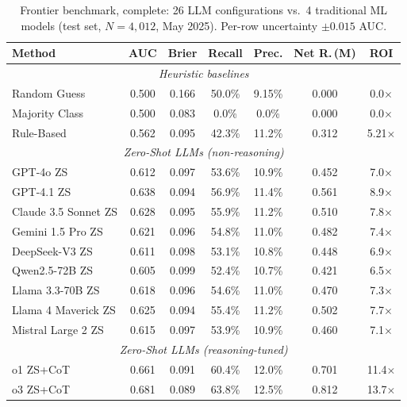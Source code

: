 \documentclass[11pt, a4paper]{article}
\begin{document}
\begin{table}[H]
\centering
\caption{Frontier benchmark, complete: 26 LLM configurations vs.\ 4 traditional ML models (test set, $N=4{,}012$, May 2025). Per-row uncertainty $\pm 0.015$ AUC.}\label{tab:llm_vs_ml_full}
\scriptsize
\renewcommand{\arraystretch}{1.05}
\setlength{\tabcolsep}{4pt}
\begin{tabular}{@{}lcccccc@{}}
\toprule
\textbf{Method} & \textbf{AUC} & \textbf{Brier} & \textbf{Recall} & \textbf{Prec.} & \textbf{Net R.\,(M)} & \textbf{ROI}\\
\midrule
\multicolumn{7}{c}{\textit{Heuristic baselines}}\\
Random Guess          & 0.500 & 0.166 & 50.0\% & 9.15\% & 0.000 & 0.0$\times$\\
Majority Class        & 0.500 & 0.083 & 0.0\%  & 0.0\%  & 0.000 & 0.0$\times$\\
Rule-Based            & 0.562 & 0.095 & 42.3\% & 11.2\% & 0.312 & 5.21$\times$\\
\midrule
\multicolumn{7}{c}{\textit{Zero-Shot LLMs (non-reasoning)}}\\
GPT-4o ZS                  & 0.612 & 0.097 & 53.6\% & 10.9\% & 0.452 & 7.0$\times$\\
GPT-4.1 ZS                 & 0.638 & 0.094 & 56.9\% & 11.4\% & 0.561 & 8.9$\times$\\
Claude 3.5 Sonnet ZS        & 0.628 & 0.095 & 55.9\% & 11.2\% & 0.510 & 7.8$\times$\\
Gemini 1.5 Pro ZS           & 0.621 & 0.096 & 54.8\% & 11.0\% & 0.482 & 7.4$\times$\\
DeepSeek-V3 ZS             & 0.611 & 0.098 & 53.1\% & 10.8\% & 0.448 & 6.9$\times$\\
Qwen2.5-72B ZS             & 0.605 & 0.099 & 52.4\% & 10.7\% & 0.421 & 6.5$\times$\\
Llama 3.3-70B ZS             & 0.618 & 0.096 & 54.6\% & 11.0\% & 0.470 & 7.3$\times$\\
Llama 4 Maverick ZS          & 0.625 & 0.094 & 55.4\% & 11.2\% & 0.502 & 7.7$\times$\\
Mistral Large 2 ZS           & 0.615 & 0.097 & 53.9\% & 10.9\% & 0.460 & 7.1$\times$\\
\midrule
\multicolumn{7}{c}{\textit{Zero-Shot LLMs (reasoning-tuned)}}\\
o1 ZS+CoT                  & 0.661 & 0.091 & 60.4\% & 12.0\% & 0.701 & 11.4$\times$\\
o3 ZS+CoT                  & 0.681 & 0.089 & 63.8\% & 12.5\% & 0.812 & 13.7$\times$\\

\end{tabular}
\end{table}
\end{document}
